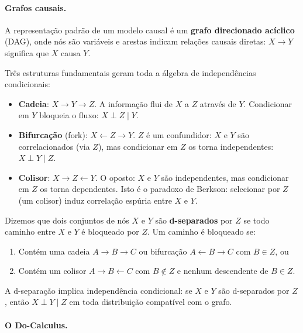 \documentclass{tufte-handout}
\begin{document}
\paragraph{Grafos causais.}

A representação padrão de um modelo causal é um \textbf{grafo direcionado acíclico}
(DAG), onde nós são variáveis e arestas indicam relações causais diretas:
$X \to Y$ significa que $X$ causa $Y$.

Três estruturas fundamentais geram toda a álgebra de independências condicionais:

\begin{itemize}
    \item \textbf{Cadeia}: $X \to Y \to Z$. A informação flui de $X$ a $Z$ através
    de $Y$. Condicionar em $Y$ bloqueia o fluxo: $X \perp Z \mid Y$.
    \item \textbf{Bifurcação} (fork): $X \leftarrow Z \to Y$. $Z$ é um confundidor:
    $X$ e $Y$ são correlacionados (via $Z$), mas condicionar em $Z$ os torna
    independentes: $X \perp Y \mid Z$.
    \item \textbf{Colisor}: $X \to Z \leftarrow Y$. O oposto: $X$ e $Y$ são
    independentes, mas condicionar em $Z$ os torna dependentes. Isto é o paradoxo
    de Berkson: selecionar por $Z$ (um colisor) induz correlação espúria entre $X$
    e $Y$.
\end{itemize}

\begin{defn}[d-separação]
    Dizemos que dois conjuntos de nós $X$ e $Y$ são \textbf{d-separados} por $Z$ se
    todo caminho entre $X$ e $Y$ é bloqueado por $Z$. Um caminho é bloqueado se:
    \begin{enumerate}
        \item Contém uma cadeia $A \to B \to C$ ou bifurcação $A \leftarrow B \to C$
        com $B \in Z$, ou
        \item Contém um colisor $A \to B \leftarrow C$ com $B \notin Z$ e nenhum
        descendente de $B \in Z$.
    \end{enumerate}
    A d-separação implica independência condicional: se $X$ e $Y$ são d-separados
    por $Z$, então $X \perp Y \mid Z$ em toda distribuição compatível com o grafo.
\end{defn}

\paragraph{O Do-Calculus.}
\end{document}
